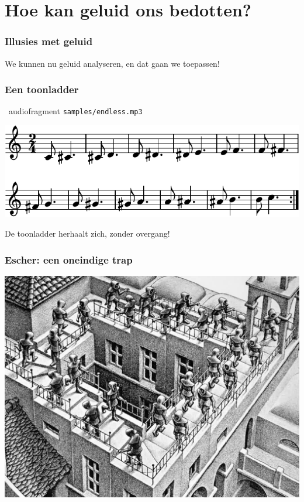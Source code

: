 \documentclass[compress, darktitle, framenumber, totalframenumber, handout]{beamer}
\begin{document}
\section{Hoe kan geluid ons bedotten?}
\begin{frame}
  \frametitle{Illusies met geluid}

  We kunnen nu geluid analyseren, en dat gaan we toepassen!

  \centering
\end{frame}

\begin{frame}
  \frametitle{Een toonladder}

  \begin{block}{\twonotes\ audiofragment}
    \texttt{samples/endless.mp3}
  \end{block}
  \pause
  \begin{center}
    \includegraphics{scores/endless-cropped}
  \end{center}
  \pause
  De toonladder \alert{herhaalt} zich, zonder overgang!
\end{frame}

\begin{frame}
  \frametitle{Escher: een oneindige trap}

  \centering
  \includegraphics[width=.8\textwidth]{images/escher}
\end{frame}
\end{document}
